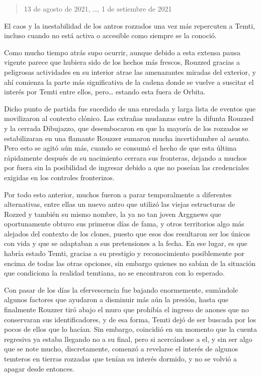 \documentclass[
  spanish,
]{book}
\begin{document}
\begin{quote}
13 de agosto de 2021, \ldots, 1 de setiembre de 2021
\end{quote}

El caos y la inestabilidad de los antros rozzados una vez más repercuten a Temti, incluso cuando no está activa o accesible como siempre se la conoció.

Como mucho tiempo atrás supo ocurrir, aunque debido a esta extensa pausa vigente parece que hubiera sido de los hechos más frescos, Rouzzed gracias a peligrosas actividades en su interior atrae las amenazantes miradas del exterior, y ahí comienza la parte más significativa de la cadena donde se vuelve a suscitar el interés por Temti entre ellos, pero\ldots{} estando esta fuera de Orbita.

Dicho punto de partida fue sucedido de una enredada y larga lista de eventos que movilizaron al contexto clónico. Las extrañas mudanzas entre la difunta Rouzzed y la cerrada Dibujazzo, que desembocaron en que la mayoría de los rozzados se estabilizaran en una flamante Rouzzer sumaron mucha incertidumbre al asunto. Pero esto se agitó aún más, cuando se consumó el hecho de que esta última rápidamente después de su nacimiento cerrara sus fronteras, dejando a muchos por fuera sin la posibilidad de ingresar debido a que no poseían las credenciales exigidas en los controles fronterizos.

Por todo esto anterior, muchos fueron a parar temporalmente a diferentes alternativas, entre ellas un nuevo antro que utilizó las viejas estructuras de Rozzed y también su mismo nombre, la ya no tan joven Arggnews que oportunamente obtuvo sus primeros días de fama, y otros territorios algo más alejados del contexto de los clones, puesto que esos dos resultaron ser los únicos con vida y que se adaptaban a sus pretensiones a la fecha. En ese lugar, es que habría estado Temti, gracias a su prestigio y reconocimiento posiblemente por encima de todas las otras opciones, sin embargo quienes no sabían de la situación que condiciona la realidad temtiana, no se encontraron con lo esperado.

Con pasar de los días la efervescencia fue bajando enormemente, sumándole algunos factores que ayudaron a disminuir más aún la presión, hasta que finalmente Rouzzer tiró abajo el muro que prohibía el ingreso de anones que no conservaran sus identificadores, y de esa forma, Temti dejó de ser buscada por los pocos de ellos que lo hacían. Sin embargo, coincidió en un momento que la cuenta regresiva ya estaba llegando no a su final, pero si acercándose a el, y sin ser algo que se note mucho, discretamente, comenzó a revelarse el interés de algunos temteros en tierras rozzadas que tenían su interés dormido, y no se volvió a apagar desde entonces.
\end{document}
